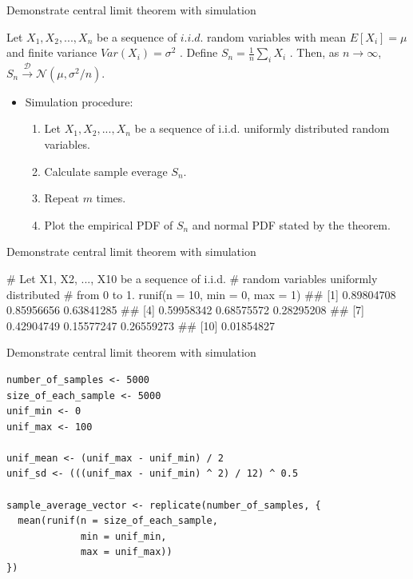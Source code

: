 \documentclass[12pt, t, xcolor=dvipsnames]{beamer}
\begin{document}
\begin{frame}{Demonstrate central limit theorem with simulation}

\begin{Theorem}

Let ${X_1, X_2, ..., X_n}$ be a sequence of $i.i.d.$ random variables with mean $E \left[{X_i}\right] = \mu$ and finite variance $Var \left({X_i}\right) = \sigma^2$ . 
Define $\displaystyle S_n = \frac{1}{n} \sum_i X_i$ . Then, as $n \to \infty$, $\displaystyle S_n \xrightarrow {\mathcal{D}} \mathcal{N} \left({\mu,\sigma^2/n}\right).$

\end{Theorem}

\begin{itemize}
  \item Simulation procedure:
  \begin{enumerate}
    \item Let ${X_1, X_2, ..., X_n}$ be a sequence of i.i.d. uniformly distributed random variables.
    \item Calculate sample everage $S_n$. 
    \item Repeat $m$ times. 
    \item Plot the empirical PDF of $S_n$ and normal PDF stated by the theorem. 
  \end{enumerate}
\end{itemize}

\end{frame}

\begin{frame}[fragile]{Demonstrate central limit theorem with simulation}

\begin{Rcode}
# Let X1, X2, ..., X10 be a sequence of i.i.d. 
# random variables uniformly distributed 
# from 0 to 1.
runif(n = 10, min = 0, max = 1)
##  [1]  0.89804708 0.85956656 0.63841285 
##  [4]  0.59958342 0.68575572 0.28295208
##  [7]  0.42904749 0.15577247 0.26559273
##  [10] 0.01854827
\end{Rcode}

\end{frame}


\begin{frame}[fragile]{Demonstrate central limit theorem with simulation}

\begin{verbatim}
number_of_samples <- 5000
size_of_each_sample <- 5000
unif_min <- 0
unif_max <- 100

unif_mean <- (unif_max - unif_min) / 2
unif_sd <- (((unif_max - unif_min) ^ 2) / 12) ^ 0.5

sample_average_vector <- replicate(number_of_samples, {
  mean(runif(n = size_of_each_sample, 
             min = unif_min, 
             max = unif_max))
})
\end{verbatim}
\end{frame}
\end{document}
